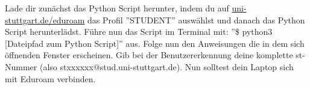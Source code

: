 
\label{ex1}
Lade dir zunächst das Python Script herunter, indem du auf \href{eduroamurllinux}{uni-stuttgart.de/eduroam} das Profil ''STUDENT'' auswählst und danach das Python Script herunterlädst.\newline
Führe nun das Script im Terminal mit: ''\$ python3 [Dateipfad zum Python Script]'' aus. Folge nun den Anweisungen die in dem sich öffnenden Fenster erscheinen. Gib bei der Benutzererkennung deine komplette st-Nummer (also stxxxxxx@stud.uni-stuttgart.de).\newline
Nun solltest dein Laptop sich mit Eduroam verbinden.